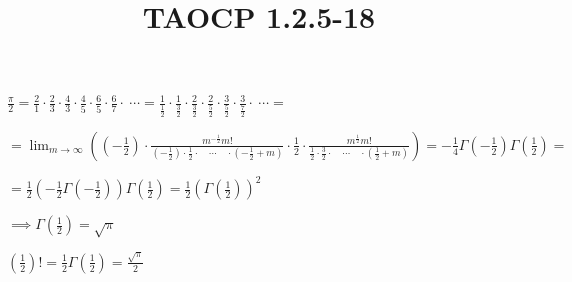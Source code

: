 \documentclass{article}
\title{TAOCP 1.2.5\mbox{-}18}
\begin{document}
\maketitle

\( \frac{\pi}{2} = \frac{2}{1} \cdot \frac{2}{3} \cdot \frac{4}{3} \cdot \frac{4}{5} \cdot \frac{6}{5} \cdot \frac{6}{7} \cdot\ \cdots = \frac{1}{\frac{1}{2}} \cdot \frac{1}{\frac{3}{2}} \cdot \frac{2}{\frac{3}{2}} \cdot \frac{2}{\frac{5}{2}} \cdot \frac{3}{\frac{5}{2}} \cdot \frac{3}{\frac{7}{2}} \cdot\ \cdots = \)

\( = \lim_{m\to\infty} ((-\frac{1}{2}) \cdot \frac{m^{-\frac{1}{2}}m!}{(-\frac{1}{2}) \cdot \frac{1}{2} \cdot \quad \cdots \quad \cdot (-\frac{1}{2} + m)} \cdot \frac{1}{2} \cdot \frac{m^{\frac{1}{2}} m!}{\frac{1}{2} \cdot \frac{3}{2} \cdot \quad \cdots \quad \cdot (\frac{1}{2} + m)}) = -\frac{1}{4} \Gamma(-\frac{1}{2})\Gamma(\frac{1}{2}) = \)

\( = \frac{1}{2} (-\frac{1}{2}\Gamma(-\frac{1}{2}))\Gamma(\frac{1}{2}) = \frac{1}{2}{(\Gamma(\frac{1}{2}))}^{2} \)

\( \implies \Gamma(\frac{1}{2}) = \sqrt{\pi} \)

\( (\frac{1}{2})! = \frac{1}{2} \Gamma(\frac{1}{2}) = \frac{\sqrt{\pi}}{2} \)
\end{document}
